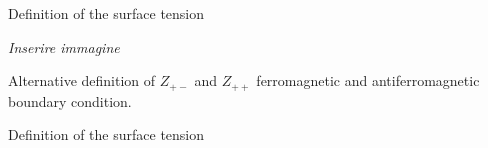 \documentclass{beamer}
\begin{document}
\begin{frame}{Definition of the surface tension}
\begin{center}

\textit{Inserire immagine}

Alternative definition of $Z_{+-}$ and $Z_{++}$ ferromagnetic and antiferromagnetic boundary condition.

\end{center}
\end{frame}

\begin{frame}{Definition of the surface tension}
\begin{center}


\end{center}
\end{frame}


\end{document}
